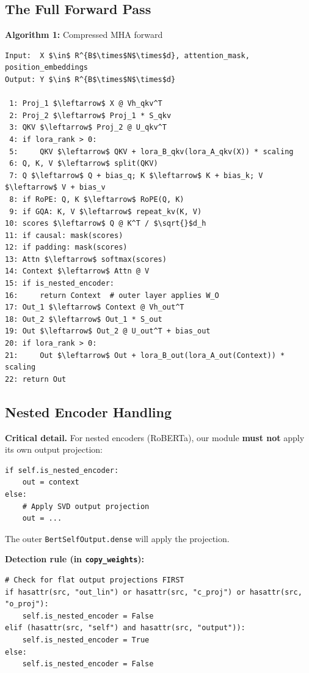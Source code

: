 \subsection{The Full Forward Pass}

\textbf{Algorithm 1:} Compressed MHA forward
\begin{lstlisting}
Input:  X $\in$ R^{B$\times$N$\times$d}, attention_mask, position_embeddings
Output: Y $\in$ R^{B$\times$N$\times$d}

 1: Proj_1 $\leftarrow$ X @ Vh_qkv^T
 2: Proj_2 $\leftarrow$ Proj_1 * S_qkv
 3: QKV $\leftarrow$ Proj_2 @ U_qkv^T
 4: if lora_rank > 0:
 5:     QKV $\leftarrow$ QKV + lora_B_qkv(lora_A_qkv(X)) * scaling
 6: Q, K, V $\leftarrow$ split(QKV)
 7: Q $\leftarrow$ Q + bias_q; K $\leftarrow$ K + bias_k; V $\leftarrow$ V + bias_v
 8: if RoPE: Q, K $\leftarrow$ RoPE(Q, K)
 9: if GQA: K, V $\leftarrow$ repeat_kv(K, V)
10: scores $\leftarrow$ Q @ K^T / $\sqrt{}$d_h
11: if causal: mask(scores)
12: if padding: mask(scores)
13: Attn $\leftarrow$ softmax(scores)
14: Context $\leftarrow$ Attn @ V
15: if is_nested_encoder:
16:     return Context  # outer layer applies W_O
17: Out_1 $\leftarrow$ Context @ Vh_out^T
18: Out_2 $\leftarrow$ Out_1 * S_out
19: Out $\leftarrow$ Out_2 @ U_out^T + bias_out
20: if lora_rank > 0:
21:     Out $\leftarrow$ Out + lora_B_out(lora_A_out(Context)) * scaling
22: return Out
\end{lstlisting}

\subsection{Nested Encoder Handling}

\textbf{Critical detail.} For nested encoders (RoBERTa), our module \textbf{must not} 
apply its own output projection:

\begin{lstlisting}
if self.is_nested_encoder:
    out = context
else:
    # Apply SVD output projection
    out = ...
\end{lstlisting}

The outer \texttt{BertSelfOutput.dense} will apply the projection.

\textbf{Detection rule (in \texttt{copy\_weights}):}

\begin{lstlisting}
# Check for flat output projections FIRST
if hasattr(src, "out_lin") or hasattr(src, "c_proj") or hasattr(src, "o_proj"):
    self.is_nested_encoder = False
elif (hasattr(src, "self") and hasattr(src, "output")):
    self.is_nested_encoder = True
else:
    self.is_nested_encoder = False
\end{lstlisting}

